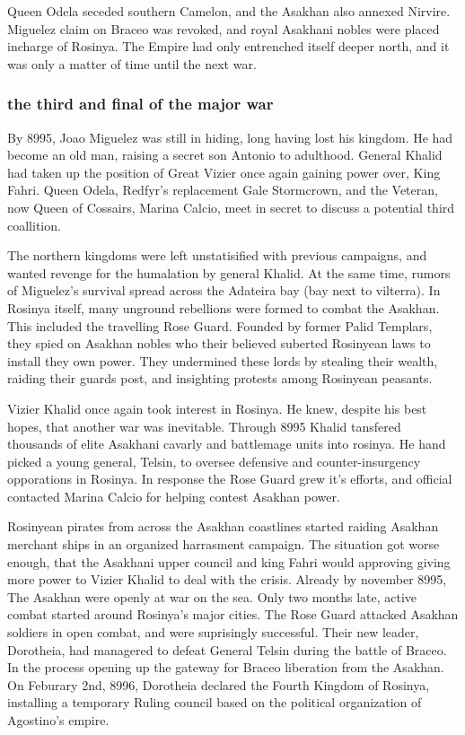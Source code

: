 \documentclass[../main.tex]{subfiles}
\begin{document}
Queen Odela seceded southern Camelon, and the Asakhan also annexed Nirvire. Miguelez claim on Braceo was revoked,
and royal Asakhani nobles were placed incharge of Rosinya. The Empire had only entrenched itself deeper north, and 
it was only a matter of time until the next war.

\subsubsection{the third and final of the major war}
By 8995, Joao Miguelez was still in hiding, long having lost his kingdom. He had become an old man, raising a secret
son Antonio to adulthood. General Khalid had taken up the position of Great Vizier once again gaining power over, 
King Fahri. Queen Odela, Redfyr's replacement Gale Stormcrown, and the Veteran, now Queen of Cossairs, Marina Calcio,
meet in secret to discuss a potential third coallition.

The northern kingdoms were left unstatisified with previous campaigns, and wanted revenge for the humalation by general
Khalid. At the same time, rumors of Miguelez's survival spread across the Adateira bay (bay next to vilterra). In 
Rosinya itself, many unground rebellions were formed to combat the Asakhan. This included the travelling Rose Guard. 
Founded by former Palid Templars, they spied on Asakhan nobles who their believed suberted Rosinyean laws to install
they own power. They undermined these lords by stealing their wealth, raiding their guards post, and insighting protests
among Rosinyean peasants. 

Vizier Khalid once again took interest in Rosinya. He knew, despite his best hopes, that another war was inevitable.
Through 8995 Khalid tansfered thousands of elite Asakhani cavarly and battlemage units into rosinya. He hand picked 
a young general, Telsin, to oversee defensive and counter-insurgency opporations in Rosinya. In response the Rose 
Guard grew it's efforts, and official contacted Marina Calcio for helping contest Asakhan power. 

Rosinyean pirates from across the Asakhan coastlines started raiding Asakhan merchant ships in an organized harrasment
campaign. The situation got worse enough, that the Asakhani upper council and king Fahri would approving giving 
more power to Vizier Khalid to deal with the crisis. Already by november 8995, The Asakhan were openly at war
on the sea. Only two months late, active combat started around Rosinya's major cities. The Rose Guard attacked 
Asakhan soldiers in open combat, and were suprisingly successful. Their new leader, Dorotheia, had managered to defeat
General Telsin during the battle of Braceo. In the process opening up the gateway for Braceo liberation from the Asakhan.
On Feburary 2nd, 8996, Dorotheia declared the Fourth Kingdom of Rosinya, installing a temporary Ruling council based on 
the political organization of Agostino's empire. 
\end{document}
